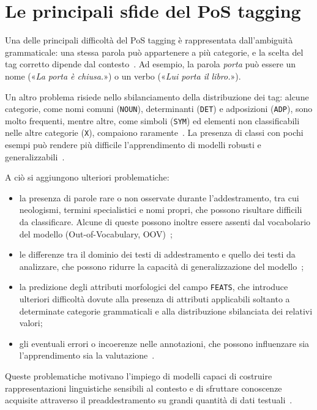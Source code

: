 \documentclass[12pt,a4paper]{report}
\begin{document}
\section{Le principali sfide del PoS tagging}
\label{sec:pos-tagging-challenges}
Una delle principali difficoltà del PoS tagging è rappresentata dall'ambiguità grammaticale: una stessa parola può appartenere a più categorie, e la scelta del tag corretto dipende dal contesto~\cite{manning2011}. Ad esempio, la parola \emph{porta} può essere un nome («\emph{La porta è chiusa.}») o un verbo («\emph{Lui porta il libro.}»).

Un altro problema risiede nello sbilanciamento della distribuzione dei tag: alcune categorie, come nomi comuni (\texttt{NOUN}), determinanti (\texttt{DET}) e adposizioni (\texttt{ADP}), sono molto frequenti, mentre altre, come simboli (\texttt{SYM}) ed elementi non classificabili nelle altre categorie (\texttt{X}), compaiono raramente~\cite{isdt}. La presenza di classi con pochi esempi può rendere più difficile l'apprendimento di modelli robusti e generalizzabili~\cite{he2009}.

A ciò si aggiungono ulteriori problematiche:

\begin{itemize}
    \item la presenza di parole rare o non osservate durante l'addestramento, tra cui neologismi, termini specialistici e nomi propri, che possono risultare difficili da classificare. Alcune di queste possono inoltre essere assenti dal vocabolario del modello (Out-of-Vocabulary, OOV)~\cite{plank2016};
    \item le differenze tra il dominio dei testi di addestramento e quello dei testi da analizzare, che possono ridurre la capacità di generalizzazione del modello~\cite{manning2011};
    \item la predizione degli attributi morfologici del campo \texttt{FEATS}, che introduce ulteriori difficoltà dovute alla presenza di attributi applicabili soltanto a determinate categorie grammaticali e alla distribuzione sbilanciata dei relativi valori;
    \item gli eventuali errori o incoerenze nelle annotazioni, che possono influenzare sia l'apprendimento sia la valutazione~\cite{manning2011}.
\end{itemize}

Queste problematiche motivano l'impiego di modelli capaci di costruire rappresentazioni linguistiche sensibili al contesto e di sfruttare conoscenze acquisite attraverso il preaddestramento su grandi quantità di dati testuali~\cite{devlin2019}.
\end{document}
